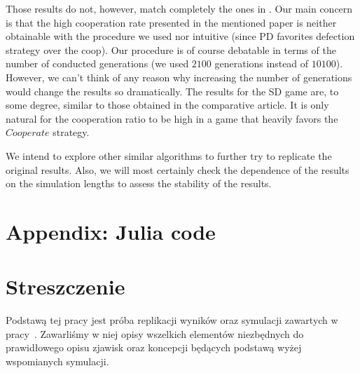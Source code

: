 \documentclass[english, twoside, 12pt, a4paper]{article}
\theoremstyle{definition}
\theoremstyle{plain}
\theoremstyle{remark}
\begin{document}

Those results do not, however, match completely the ones in \cite{santos2005scale}. Our main concern is that the high cooperation rate presented in the mentioned paper is neither obtainable with the procedure we used nor intuitive (since PD favorites defection strategy over the coop). Our procedure is of course debatable in terms of the number of conducted generations (we used $2100$ generations instead of $10100$). However, we can't think of any reason why increasing the number of generations would change the results so dramatically. The results for the SD game are, to some degree, similar to those obtained in the comparative article. It is only natural for the cooperation ratio to be high in a game that heavily favors the $Cooperate$ strategy.


We intend to explore other similar algorithms to further try to replicate the original results. Also, we will most certainly check the dependence of the results on the simulation lengths to assess the stability of the results.

\appendix
\section{Appendix: Julia code}




\clearpage




\clearpage
{}
\listoffigures

\clearpage
{}
\section*{Streszczenie}

Podstawą tej pracy jest próba replikacji wyników oraz symulacji zawartych w pracy~\cite{santos2005scale}. Zawarliśmy w niej opisy wszelkich elementów niezbędnych do prawidłowego opisu
zjawisk oraz koncepcji będących podstawą wyżej wspomianych symulacji. 
\end{document}
